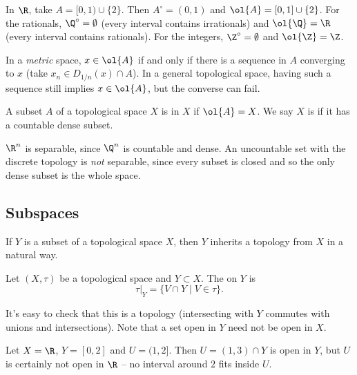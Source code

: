 \begin{example}
    In $\R$, take $A = [0, 1) \cup \{2\}$. Then $A^{\circ} = (0, 1)$ and $\ol{A} = [0, 1] \cup \{2\}$. For the rationals, $\Q^{\circ} = \emptyset$ (every interval contains irrationals) and $\ol{\Q} = \R$ (every interval contains rationals). For the integers, $\Z^{\circ} = \emptyset$ and $\ol{\Z} = \Z$.
\end{example}

\begin{remark}
    In a \emph{metric} space, $x \in \ol{A}$ if and only if there is a sequence in $A$ converging to $x$ (take $x_n \in D_{1/n}(x) \cap A$). In a general topological space, having such a sequence still implies $x \in \ol{A}$, but the converse can fail.
\end{remark}

\begin{definition}
    A subset $A$ of a topological space $X$ is  in $X$ if $\ol{A} = X$. We say $X$ is  if it has a countable dense subset.
\end{definition}

\begin{example}
    $\R^n$ is separable, since $\Q^n$ is countable and dense. An uncountable set with the discrete topology is \emph{not} separable, since every subset is closed and so the only dense subset is the whole space.
\end{example}

\subsection{Subspaces}

If $Y$ is a subset of a topological space $X$, then $Y$ inherits a topology from $X$ in a natural way.

\begin{definition}
    Let $(X, \tau)$ be a topological space and $Y \subset X$. The  on $Y$ is
    $$
    \tau|_Y = \{V \cap Y \mid V \in \tau\}.
    $$
\end{definition}

It's easy to check that this is a topology (intersecting with $Y$ commutes with unions and intersections). Note that a set open in $Y$ need not be open in $X$.

\begin{example}
    Let $X = \R$, $Y = [0, 2]$ and $U = (1, 2]$. Then $U = (1, 3) \cap Y$ is open in $Y$, but $U$ is certainly not open in $\R$ -- no interval around $2$ fits inside $U$.
\end{example}

